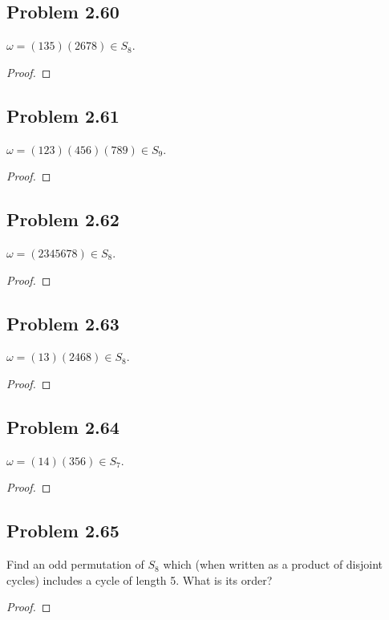 \documentclass{amsbook}
\begin{document}
			\subsection*{Problem 2.60}
			\label{sub:problem_2_60}
			$\omega = (135)(2678) \in S_{8}$.
			\begin{proof}
			\end{proof}

			\subsection*{Problem 2.61}
			\label{sub:problem_2_61}
			$\omega = (123)(456)(789) \in S_{9}$.
			\begin{proof}
			\end{proof}

			\subsection*{Problem 2.62}
			\label{sub:problem_2_62}
			$\omega = (2345678) \in S_{8}$.
			\begin{proof}
			\end{proof}

			\subsection*{Problem 2.63}
			\label{sub:problem_2_63}
			$\omega = (13)(2468) \in S_{8}$.
			\begin{proof}
			\end{proof}

			\subsection*{Problem 2.64}
			\label{sub:problem_2_64}
			$\omega = (14)(356) \in S_{7}$.
			\begin{proof}
			\end{proof}

			\subsection*{Problem 2.65}
			\label{sub:problem_2_65}
			Find an odd permutation of $S_{8}$ which (when written as a product of disjoint cycles) includes a cycle of length 5. 
			What is its order?
			\begin{proof}
			\end{proof}
\end{document}
